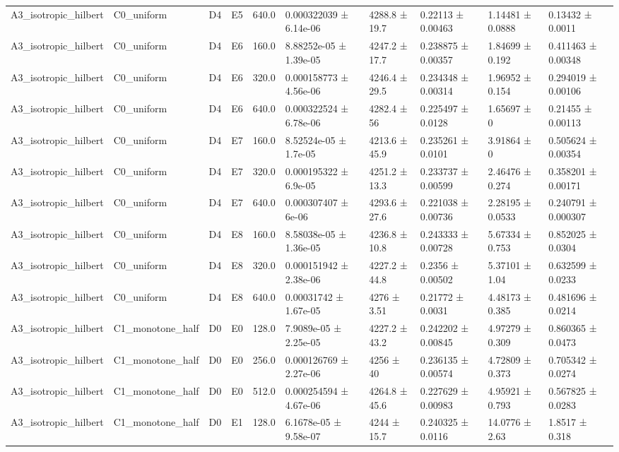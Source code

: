 \begin{table}
\begin{tabular}{llllllllll}
A3\_isotropic\_hilbert & C0\_uniform & D4 & E5 & 640.0 & 0.000322039 ± 6.14e-06 & 4288.8 ± 19.7 & 0.22113 ± 0.00463 & 1.14481 ± 0.0888 & 0.13432 ± 0.0011 \\
A3\_isotropic\_hilbert & C0\_uniform & D4 & E6 & 160.0 & 8.88252e-05 ± 1.39e-05 & 4247.2 ± 17.7 & 0.238875 ± 0.00357 & 1.84699 ± 0.192 & 0.411463 ± 0.00348 \\
A3\_isotropic\_hilbert & C0\_uniform & D4 & E6 & 320.0 & 0.000158773 ± 4.56e-06 & 4246.4 ± 29.5 & 0.234348 ± 0.00314 & 1.96952 ± 0.154 & 0.294019 ± 0.00106 \\
A3\_isotropic\_hilbert & C0\_uniform & D4 & E6 & 640.0 & 0.000322524 ± 6.78e-06 & 4282.4 ± 56 & 0.225497 ± 0.0128 & 1.65697 ± 0 & 0.21455 ± 0.00113 \\
A3\_isotropic\_hilbert & C0\_uniform & D4 & E7 & 160.0 & 8.52524e-05 ± 1.7e-05 & 4213.6 ± 45.9 & 0.235261 ± 0.0101 & 3.91864 ± 0 & 0.505624 ± 0.00354 \\
A3\_isotropic\_hilbert & C0\_uniform & D4 & E7 & 320.0 & 0.000195322 ± 6.9e-05 & 4251.2 ± 13.3 & 0.233737 ± 0.00599 & 2.46476 ± 0.274 & 0.358201 ± 0.00171 \\
A3\_isotropic\_hilbert & C0\_uniform & D4 & E7 & 640.0 & 0.000307407 ± 6e-06 & 4293.6 ± 27.6 & 0.221038 ± 0.00736 & 2.28195 ± 0.0533 & 0.240791 ± 0.000307 \\
A3\_isotropic\_hilbert & C0\_uniform & D4 & E8 & 160.0 & 8.58038e-05 ± 1.36e-05 & 4236.8 ± 10.8 & 0.243333 ± 0.00728 & 5.67334 ± 0.753 & 0.852025 ± 0.0304 \\
A3\_isotropic\_hilbert & C0\_uniform & D4 & E8 & 320.0 & 0.000151942 ± 2.38e-06 & 4227.2 ± 44.8 & 0.2356 ± 0.00502 & 5.37101 ± 1.04 & 0.632599 ± 0.0233 \\
A3\_isotropic\_hilbert & C0\_uniform & D4 & E8 & 640.0 & 0.00031742 ± 1.67e-05 & 4276 ± 3.51 & 0.21772 ± 0.0031 & 4.48173 ± 0.385 & 0.481696 ± 0.0214 \\
A3\_isotropic\_hilbert & C1\_monotone\_half & D0 & E0 & 128.0 & 7.9089e-05 ± 2.25e-05 & 4227.2 ± 43.2 & 0.242202 ± 0.00845 & 4.97279 ± 0.309 & 0.860365 ± 0.0473 \\
A3\_isotropic\_hilbert & C1\_monotone\_half & D0 & E0 & 256.0 & 0.000126769 ± 2.27e-06 & 4256 ± 40 & 0.236135 ± 0.00574 & 4.72809 ± 0.373 & 0.705342 ± 0.0274 \\
A3\_isotropic\_hilbert & C1\_monotone\_half & D0 & E0 & 512.0 & 0.000254594 ± 4.67e-06 & 4264.8 ± 45.6 & 0.227629 ± 0.00983 & 4.95921 ± 0.793 & 0.567825 ± 0.0283 \\
A3\_isotropic\_hilbert & C1\_monotone\_half & D0 & E1 & 128.0 & 6.1678e-05 ± 9.58e-07 & 4244 ± 15.7 & 0.240325 ± 0.0116 & 14.0776 ± 2.63 & 1.8517 ± 0.318 \\

\end{tabular}
\end{table}
